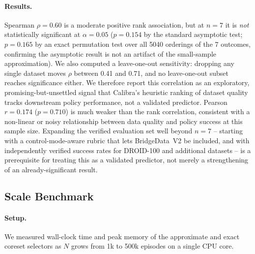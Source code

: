 \documentclass[10pt,twocolumn]{article}
\begin{document}
\paragraph{Results.}
Spearman $\rho = 0.60$ is a moderate positive rank association, but at
$n = 7$ it is \emph{not} statistically significant at $\alpha = 0.05$
($p = 0.154$ by the standard asymptotic test; $p = 0.165$ by an exact
permutation test over all 5040 orderings of the 7 outcomes, confirming the
asymptotic result is not an artifact of the small-sample approximation). We
also computed a leave-one-out sensitivity: dropping any single dataset moves
$\rho$ between 0.41 and 0.71, and no leave-one-out subset reaches
significance either. We therefore report this correlation as an exploratory,
promising-but-unsettled signal that Calibra's heuristic ranking of dataset
quality tracks downstream policy performance, not a validated predictor.
Pearson $r = 0.174$ ($p = 0.710$) is much weaker than the rank correlation,
consistent with a non-linear or noisy relationship between data quality and
policy success at this sample size. Expanding the verified evaluation set
well beyond $n = 7$ -- starting with a control-mode-aware rubric that lets
BridgeData~V2 be included, and with independently verified success rates for
DROID-100 and additional datasets -- is a prerequisite for treating this as a
validated predictor, not merely a strengthening of an already-significant
result.

\subsection{Scale Benchmark}
\label{sec:scale}

\paragraph{Setup.}
We measured wall-clock time and peak memory of the approximate and exact
coreset selectors as $N$ grows from 1k to 500k episodes on a single CPU core.

\begin{table}[h]
\centering
\caption{Approximate selector runtime and memory (keep 30\%, batch size 1000, single CPU core).}
\label{tab:scale}
\small
{}
\end{table}
\end{document}
